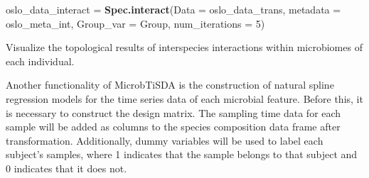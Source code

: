 \documentclass[
]{article}
\newenvironment{Shaded}{\begin{snugshade}}{\end{snugshade}}
\newcommand{\AttributeTok}[1]{\textcolor[rgb]{0.13,0.29,0.53}{#1}}
\newcommand{\DecValTok}[1]{\textcolor[rgb]{0.00,0.00,0.81}{#1}}
\newcommand{\FloatTok}[1]{\textcolor[rgb]{0.00,0.00,0.81}{#1}}
\newcommand{\FunctionTok}[1]{\textcolor[rgb]{0.13,0.29,0.53}{\textbf{#1}}}
\newcommand{\NormalTok}[1]{#1}
\newcommand{\OtherTok}[1]{\textcolor[rgb]{0.56,0.35,0.01}{#1}}
\newcommand{\SpecialCharTok}[1]{\textcolor[rgb]{0.81,0.36,0.00}{\textbf{#1}}}
\newcommand{\StringTok}[1]{\textcolor[rgb]{0.31,0.60,0.02}{#1}}
\begin{document}
\begin{Shaded}
\begin{Highlighting}[]
\NormalTok{oslo\_data\_interact }\OtherTok{=} \FunctionTok{Spec.interact}\NormalTok{(}\AttributeTok{Data =}\NormalTok{ oslo\_data\_trans,}
                                   \AttributeTok{metadata =}\NormalTok{ oslo\_meta\_int,}
                                   \AttributeTok{Group\_var =} \StringTok{\textquotesingle{}Group\textquotesingle{}}\NormalTok{,}
                                   \AttributeTok{num\_iterations =} \DecValTok{5}\NormalTok{)}
\end{Highlighting}
\end{Shaded}

Visualize the topological results of interspecies interactions within
microbiomes of each individual.

\begin{Shaded}
\end{Shaded}

Another functionality of MicrobTiSDA is the construction of natural
spline regression models for the time series data of each microbial
feature. Before this, it is necessary to construct the design matrix.
The sampling time data for each sample will be added as columns to the
species composition data frame after transformation. Additionally, dummy
variables will be used to label each subject's samples, where 1
indicates that the sample belongs to that subject and 0 indicates that
it does not.
\end{document}
